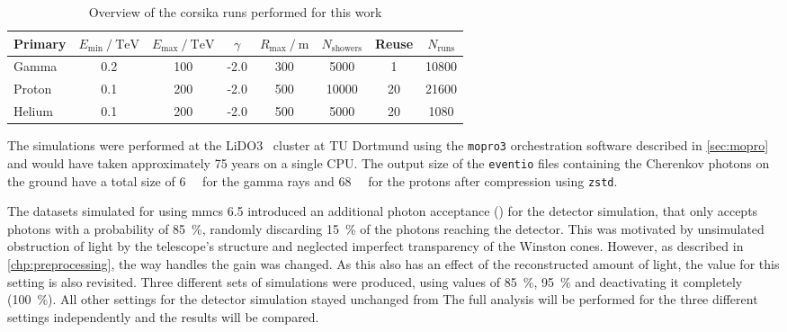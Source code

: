 \begin{table}
  \centering
  \caption{Overview of the \gls{corsika} runs performed for this work}
  \label{tab:corsika-runs}
  \begin{tabular}{
      l
      S[table-format=1.1]
      S[table-format=3.0]
      S[table-format=+1.1]
      S[table-format=3.0]
      S[table-format=5.0]
      S[table-format=2.0]
      S[table-format=5.0]
    }
    \toprule
    Primary &
    {$E_{\min} \mathbin{/} \si{\TeV}$} &
    {$E_{\max} \mathbin{/} \si{\TeV}$} &
    {$\gamma$} &
    {$R_{\max} \mathbin{/} \si{\meter}$} &
    {$N_\text{showers}$} &
    {Reuse} &
    {$N_\text{runs}$} \\
    \midrule
    Gamma & 0.2 & 100 & -2.0 & 300 & 5000 & 1 & 10800 \\
    Proton & 0.1 & 200 & -2.0 & 500 & 10000  & 20 & 21600 \\
    Helium & 0.1 & 200 & -2.0 & 500 & 5000  & 20 & 1080 \\
    \bottomrule
  \end{tabular}
\end{table}

The simulations were performed at the LiDO3~\cite{lido3} cluster at TU Dortmund
using the \texttt{mopro3} orchestration software described in \autoref{sec:mopro} and
would have taken approximately 75 years on a single CPU.
The output size of the \texttt{eventio} files containing the Cherenkov photons on the 
ground have a total size of \SI{6}{\tera\byte} for the gamma rays and \SI{68}{\tera\byte}
for the protons after compression using \texttt{zstd}.

The datasets simulated for \cite{phd-temme} using \gls{mmcs} 6.5 introduced
an additional photon acceptance () for the detector simulation,
that only accepts photons with a probability of \SI{85}{\percent}, 
randomly discarding \SI{15}{\percent} of the photons reaching the detector.
This was motivated by unsimulated obstruction of light by the telescope's structure and
neglected imperfect transparency of the Winston cones.
However, as described in \autoref{chp:preprocessing},
the way \facttools{} handles the gain was changed.
As this also has an effect of the reconstructed amount of light,
the value for this setting is also revisited.
Three different sets of simulations were produced, using  values of \SI{85}{\percent},
\SI{95}{\percent} and deactivating it completely (\SI{100}{\percent}).
All other settings for the detector simulation stayed unchanged from \cite[131\psq]{phd-temme}
The full analysis will be performed for the three different settings independently
and the results will be compared.

